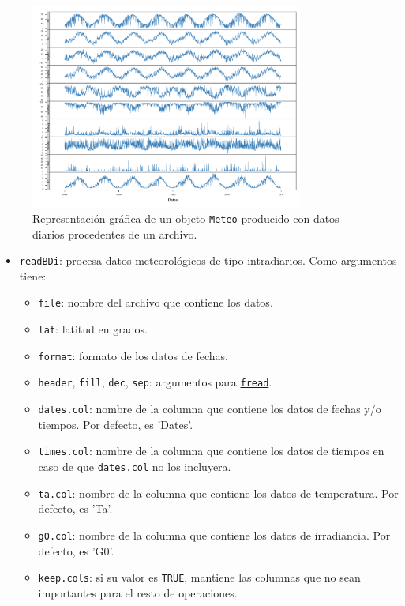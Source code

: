\begin{itemize}
\begin{figure}[!htb]
\centering
\includegraphics[width=0.8\textwidth]{figuras/codigo-readBD.pdf}
\caption{Representación gráfica de un objeto \texttt{Meteo} producido con datos diarios procedentes de un archivo.}
\end{figure}
\begin{itemize}
\item \texttt{readBDi}: procesa datos meteorológicos de tipo intradiarios.
Como argumentos tiene:
\begin{itemize}
\item \texttt{file}: nombre del archivo que contiene los datos.
\item \texttt{lat}: latitud en grados.
\item \texttt{format}: formato de los datos de fechas.
\item \texttt{header}, \texttt{fill}, \texttt{dec}, \texttt{sep}: argumentos para \href{https://search.r-project.org/CRAN/refmans/data.table/html/fread.html}{\texttt{fread}}.
\item \texttt{dates.col}: nombre de la columna que contiene los datos de fechas y/o tiempos. Por defecto, es 'Dates'.
\item \texttt{times.col}: nombre de la columna que contiene los datos de tiempos en caso de que \texttt{dates.col} no los incluyera.
\item \texttt{ta.col}: nombre de la columna que contiene los datos de temperatura. Por defecto, es 'Ta'.
\item \texttt{g0.col}: nombre de la columna que contiene los datos de irradiancia. Por defecto, es 'G0'.
\item \texttt{keep.cols}: si su valor es \texttt{TRUE}, mantiene las columnas que no sean importantes para el resto de operaciones.

\end{itemize}
\end{itemize}
\end{itemize}
